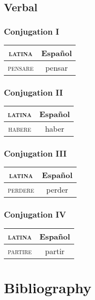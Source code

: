 \documentclass{report}
\begin{document}
\section{Verbal}

\subsection{Conjugation I}

\begin{tabular}{|c|c|}
  \hline
  \textsc{latina} & Español \\
  \hline
  \textsc{pensare} & pensar \\
  \hline
\end{tabular}

\subsection{Conjugation II}

\begin{tabular}{|c|c|}
  \hline
  \textsc{latina} & Español \\
  \hline
  \textsc{habere} & haber \\
  \hline
\end{tabular}

\subsection{Conjugation III}

\begin{tabular}{|c|c|}
  \hline
  \textsc{latina} & Español \\
  \hline
  \textsc{perdere} & perder \\
  \hline
\end{tabular}

\subsection{Conjugation IV}

\begin{tabular}{|c|c|}
  \hline
  \textsc{latina} & Español \\
  \hline
  \textsc{partire} & partir \\
  \hline
\end{tabular}

\nocite{*}

\chapter*{Bibliography}

\printbibliography[heading=subbibintoc, keyword=romance, title={Romance Linguistics}]
\end{document}
